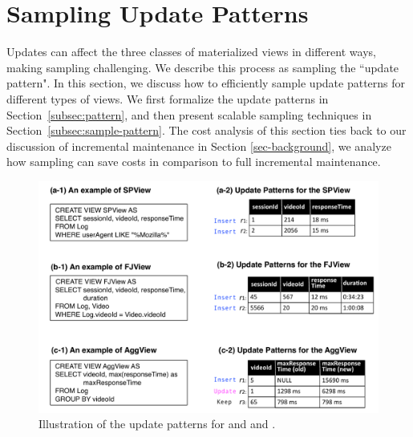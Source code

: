 \section{Sampling Update Patterns}
\label{sampling}
Updates can affect the three classes of materialized views in different ways, making sampling challenging. 
We describe this process as sampling the ``update pattern".
In this section, we discuss how to efficiently sample update patterns for different types of views.
We first formalize the update patterns in Section~\ref{subsec:pattern}, and then present scalable sampling techniques in Section~\ref{subsec:sample-pattern}. 
The cost analysis of this section ties back to our discussion of incremental maintenance in Section \ref{sec-background}, we analyze how sampling can save costs in comparison to full incremental maintenance.

\begin{figure}[tup]
\centering
 \hspace*{-2em}\includegraphics[scale=0.32]{figs/update-pattern-new.pdf}\vspace{-1em}
 \caption{Illustration of the update patterns for \spview and \fjview and \aggview.}\label{fig:update-pattern}\vspace{-1em}
\end{figure}

